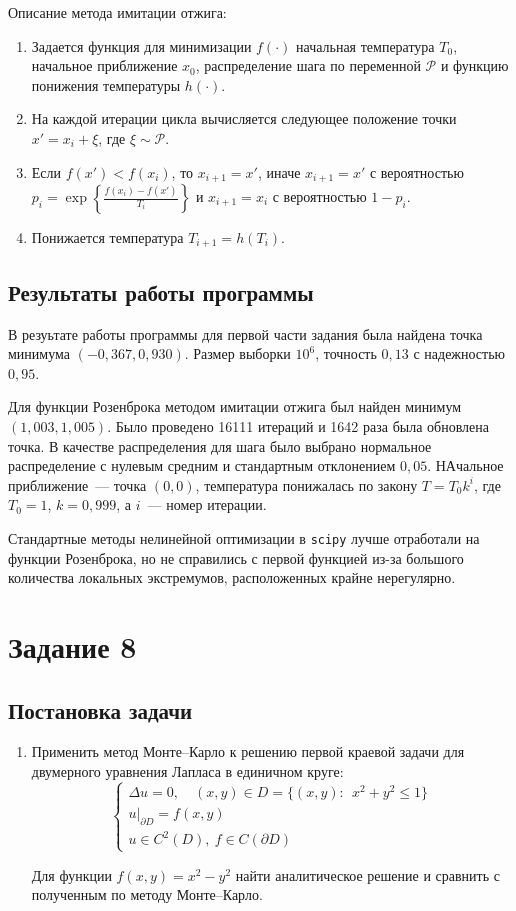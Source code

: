 \documentclass[12pt, a4paper]{article} %
\renewcommand{\le}{\leqslant}
\begin{document}
Описание метода имитации отжига:
\begin{enumerate}
    \item Задается функция для минимизации $f(\cdot)$ начальная температура $T_0$, начальное приближение $x_0$,
        распределение шага по переменной $\mathcal{P}$ и функцию понижения температуры $h(\cdot)$.
    \item На каждой итерации цикла вычисляется следующее положение точки $x' = x_i + \xi$, где $\xi \sim \mathcal{P}$.
    \item Если $f(x') < f(x_i)$, то $x_{i+1} = x'$, иначе $x_{i+1} = x'$ с вероятностью $p_i = \exp \left\{ \frac{f(x_i) - f(x')}{T_i} \right\}$
        и $x_{i+1} = x_i$ с вероятностью $1 - p_i$.
    \item Понижается температура  $T_{i+1} = h(T_i)$.
\end{enumerate} 

\subsection{Результаты работы программы}
В резуьтате работы программы для первой части задания была найдена точка минимума $(-0{,}367, 0{,}930)$.
Размер выборки  $10^6$, точность  $0{,}13$ с надежностью  $0{,}95$.

Для функции Розенброка методом имитации отжига был найден минимум  $(1{,}003, 1{,}005)$.
Было проведено  16111 итераций и 1642 раза была обновлена точка. 
В качестве распределения для шага было выбрано нормальное распределение с нулевым средним и стандартным отклонением  $0{,}05$.
НАчальное приближение~--- точка  $(0, 0)$, 
температура понижалась по закону  $T = T_0 k^i$, где  $T_0 =1$,  $k = 0{,}999$, а $i$~--- номер итерации.

Стандартные методы нелинейной оптимизации в \texttt{scipy} лучше отработали на функции Розенброка, 
но не справились с первой функцией из-за большого количества локальных экстремумов, расположенных крайне нерегулярно.

\section{Задание 8}
\subsection{Постановка задачи}
\begin{enumerate}
	\item Применить метод Монте--Карло к решению первой краевой задачи для двумерного уравнения Лапласа в единичном круге:
$$
\begin{cases}
\Delta u = 0, \quad (x, y) \in D = \{(x, y)\colon \ \ x^2 + y^2 \le 1\}\\
u|_{\partial D} = f(x, y) \\
u \in C^2(D), \ f \in C(\partial D)
\end{cases}
$$

Для функции $f(x, y) = x^2 - y^2$ найти аналитическое решение и сравнить с полученным по методу Монте--Карло.
\end{enumerate}
\end{document}
